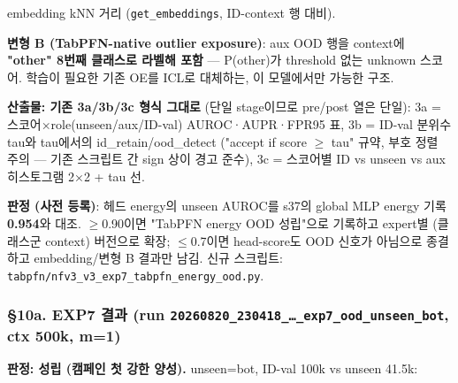 \par\noindent \textbullet\enspace embedding kNN 거리 (\texttt{get\_\allowbreak{}\allowbreak{}embe\allowbreak{}ddings}, ID-context 행 대비).


\par\noindent \textbullet\enspace \textbf{변형 B (TabPFN-native outlier exposure)}: aux OOD 행을 context에 \textbf{"other" 8번째 클래스로 라벨해 포함} — P(other)가 threshold 없는 unknown 스코어. 학습이 필요한 기존 OE를 ICL로 대체하는, 이 모델에서만 가능한 구조.


\textbf{산출물: 기존 3a/\allowbreak{}3b/\allowbreak{}3c 형식 그대로} (단일 stage이므로 pre/\allowbreak{}post 열은 단일): 3a =\allowbreak{} 스코어×role(unseen/\allowbreak{}aux/\allowbreak{}ID-val) AUROC·AUPR·FPR95 표, 3b =\allowbreak{} ID-val 분위수 tau와 tau에서의 id\_\allowbreak{}retain/\allowbreak{}ood\_\allowbreak{}detect ("accept if score \ensuremath{\geq} tau" 규약, 부호 정렬 주의 — 기존 스크립트 간 sign 상이 경고 준수), 3c =\allowbreak{} 스코어별 ID vs unseen vs aux 히스토그램 2×2 +\allowbreak{} tau 선.

\textbf{판정 (사전 등록)}: 헤드 energy의 unseen AUROC를 s37의 global MLP energy 기록 \textbf{0.954}와 대조. \ensuremath{\geq}0.90이면 "TabPFN energy OOD 성립"으로 기록하고 expert별 (클래스군 context) 버전으로 확장; \ensuremath{\leq}0.7이면 head-score도 OOD 신호가 아님으로 종결하고 embedding/\allowbreak{}변형 B 결과만 남김. 신규 스크립트: \texttt{tabpfn/\allowbreak{}\allowbreak{}n\allowbreak{}fv3\_\allowbreak{}\allowbreak{}v3\_\allowbreak{}\allowbreak{}e\allowbreak{}xp7\_\allowbreak{}\allowbreak{}tabp\allowbreak{}fn\_\allowbreak{}\allowbreak{}energ\allowbreak{}y\_\allowbreak{}\allowbreak{}ood.\allowbreak{}py\allowbreak{}}.

\subsubsection{§10a. EXP7 결과 (run \texttt{20260820\allowbreak{}\_\allowbreak{}\allowbreak{}230418\_\allowbreak{}\allowbreak{}…\_\allowbreak{}\allowbreak{}exp7\_\allowbreak{}\allowbreak{}o\allowbreak{}od\_\allowbreak{}\allowbreak{}unsee\allowbreak{}n\_\allowbreak{}\allowbreak{}bot}, ctx 500k, m=\allowbreak{}1)}
\textbf{판정: 성립 (캠페인 첫 강한 양성).} unseen=\allowbreak{}bot, ID-val 100k vs unseen 41.5k:

